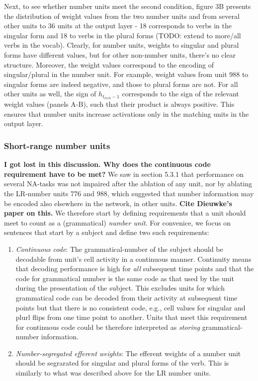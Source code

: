 Next, to see whether number units meet the second condition, figure 3B presents the distribution of weight values from the two number units and from several other units to 36 units at the output layer - 18 corresponds to verbs in the singular form and 18 to verbs in the plural forms (TODO: extend to more/all verbs in the vocab). 
Clearly, for number units, weights to singular and plural forms have different values, but for other non-number units, there's no clear structure. 
Moreover, the weight values correspond to the encoding of singular/plural in the number unit. 
For example, weight values from unit 988 to singular forms are indeed negative, and those to plural forms are not. 
For all other units as well, the sign of $h_{t_{verb}-1}$ corresponds to the sign of the relevant weight values (panels A-B), such that their product is always positive. 
This ensures that number units increase activations only in the matching units in the output layer.

\subsubsection{Short-range number units}

\textbf{I got lost in this discussion. Why does the continuous code requirement have to be met?}
We saw in section 5.3.1 that performance on several NA-tasks was not impaired after the ablation of any unit, nor by ablating the LR-number units 776 and 988, which suggested that number information may be encoded also elsewhere in the network, in other units. \textbf{Cite Dieuwke's paper on this.} 
We therefore start by defining requirements that a unit should meet to count as a (grammatical) \textit{number unit}. 
For convenice, we focus on sentences that start by a subject and define two such requirements: 
\begin{enumerate}
    \item \textit{Continuous code}: The grammatical-number of the subject should be decodable from unit's cell activity in a continuous manner. Continuity means that decoding performance is high for \textit{all} subsequent time points and that the code for grammatical number is the same code as that used by the unit during the presentation of the subject. This excludes units for which grammatical code can be decoded from their activity at subsequent time points but that there is no consistent code, e.g., cell values for singular and plurl flips from one time point to another. Units that meet this requirement for continuous code could be therefore interpreted as \textit{storing} grammatical-number information.

    \item \textit{Number-segregated efferent weights}: The efferent weights of a number unit should be segrarated for singular and plural forms of the verb. This is similarly to what was described above for the LR number units. 

\end{enumerate}

